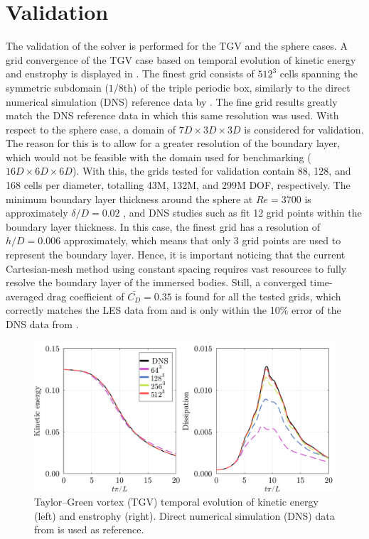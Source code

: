 \documentclass[10pt,a4paper]{article}
\begin{document}
\section{Validation} \label{sec:validation}
The validation of the solver is performed for the TGV and the sphere cases. A grid convergence of the TGV case based on temporal evolution of kinetic energy and enstrophy is displayed in . The finest grid consists of $512^3$ cells spanning the symmetric subdomain ($1/8$th) of the triple periodic box, similarly to the direct numerical simulation (DNS) reference data by \cite{Dairay2017}. The fine grid results greatly match the DNS reference data in which this same resolution was used. With respect to the sphere case, a domain of $7D\times3D\times3D$ is considered for validation. The reason for this is to allow for a greater resolution of the boundary layer, which would not be feasible with the domain used for benchmarking ($16D\times6D\times6D$). With this, the grids tested for validation contain 88, 128, and 168 cells per diameter, totalling 43M, 132M, and 299M DOF, respectively. The minimum boundary layer thickness around the sphere at $Re=3700$ is approximately $\delta/D=0.02$ \citep{Capuano2023}, and DNS studies such as \cite{Rodriguez2011} fit 12 grid points within the boundary layer thickness. In this case, the finest grid has a resolution of $h/D=0.006$ approximately, which means that only 3 grid points are used to represent the boundary layer. Hence, it is important noticing that the current Cartesian-mesh method using constant spacing requires vast resources to fully resolve the boundary layer of the immersed bodies. Still, a converged time-averaged drag coefficient of $\overline{C_D}=0.35$ is found for all the tested grids, which correctly matches the LES data from \cite{Yun2006} and is only within the 10\% error of the DNS data from \cite{Rodriguez2011}.

\begin{figure}[!t]
    \centering
    \includegraphics[width=0.7\linewidth]{img/tgv_validation.pdf}
	\caption{Taylor--Green vortex (TGV) temporal evolution of kinetic energy (left) and enstrophy (right). Direct numerical simulation (DNS) data from \cite{Dairay2017} is used as reference.}
	\label{fig:tgv_val}
\end{figure}
\end{document}
